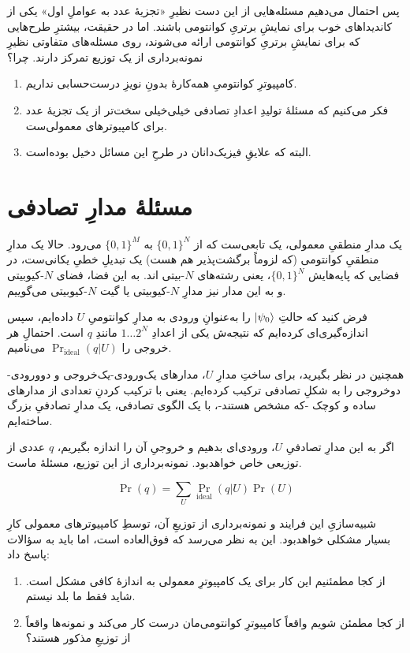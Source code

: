\documentclass[11pt]{article}
\begin{document}
پس احتمال می‌دهیم مسئله‌هایی از این دست نظیرِ «تجزیهٔ عدد به عواملِ اول» یکی از کاندیداهای خوب برای نمایشِ برتریِ کوانتومی باشند. اما در حقیقت، بیشترِ طرح‌هایی که برای نمایشِ برتریِ کوانتومی ارائه می‌شوند، روی مسئله‌های متفاوتی نظیرِ نمونه‌برداری از یک توزیع تمرکز دارند. چرا؟\cite{aaronson}

\begin{enumerate}[-]
\item کامپیوترِ کوانتومیِ همه‌کارهٔ بدونِ نویزِ درست‌حسابی نداریم.
\item فکر می‌کنیم که مسئلهٔ تولیدِ اعدادِ تصادفی خیلی‌خیلی سخت‌تر از یک تجزیهٔ عدد برای کامپیوترهای معمولی‌ست.
\item
البته که علایقِ فیزیک‌دانان در طرحِ این مسائل دخیل بوده‌است. 
\end{enumerate}

\section{مسئلهٔ مدارِ تصادفی}
یک مدارِ منطقیِ معمولی، یک تابعی‌ست که از $\{0, 1\}^N$ به $\{0, 1\}^M$ می‌رود. حالا یک مدارِ منطقیِ کوانتومی (که لزوماً برگشت‌پذیر هم هست) یک تبدیلِ خطیِ یکانی‌ست، در فضایی که  پایه‌هایش $\{0, 1\}^N$، یعنی رشته‌های $N$-بیتی اند. به این فضا،‌ فضای $N$-کیوبیتی و به این مدار نیز مدارِ $N$-کیوبیتی یا گیت $N$-کیوبیتی می‌گوییم.

فرض کنید که حالتِ $\ket{\psi_0}$ را به‌عنوانِ ورودی به مدارِ کوانتومیِ $U$ داده‌ایم، سپس اندازه‌گیری‌ای کرده‌ایم که نتیجه‌ش یکی از اعدادِ $1\dots 2^N$ مانندِ $q$ است. احتمالِ هر خروجی را 
$\Pr_\text{ideal}(q|U)$
می‌نامیم.

همچنین در نظر بگیرید، برای ساختِ مدارِ $U$، مدارهای یک‌ورودی-یک‌خروجی و دوورودی-دوخروجی را به شکلِ تصادفی ترکیب کرده‌ایم. یعنی با ترکیب کردنِ تعدادی از مدارهای ساده و کوچک -که مشخص هستند-، با یک الگوی تصادفی، یک مدارِ تصادفیِ بزرگ ساخته‌ایم.

اگر به این مدارِ تصادفیِ $U$، ورودی‌ای بدهیم و خروجیِ آن را اندازه بگیریم، $q$ عددی از توزیعی خاص خواهدبود. نمونه‌برداری از این توزیع، مسئلهٔ ماست.

\[ \Pr(q) = \sum_U \Pr_\text{ideal} (q|U) \Pr(U) \]

شبیه‌سازیِ این فرایند و نمونه‌برداری از توزیعِ آن، توسطِ کامپیوترهای معمولی کارِ بسیار مشکلی خواهدبود. \cite{boxio} این به نظر می‌رسد که فوق‌العاده‌ است، اما باید به سؤالات پاسخ داد:
\begin{enumerate}[-]
\item از کجا مطمئنیم این کار برای یک کامپیوترِ معمولی به اندازهٔ کافی مشکل است. شاید فقط ما بلد نیستم.
\item از کجا مطمئن شویم واقعاً کامپیوترِ کوانتومی‌مان درست کار می‌کند و نمونه‌ها واقعاً از توزیعِ مذکور هستند؟ 
\end{enumerate}
\end{document}
